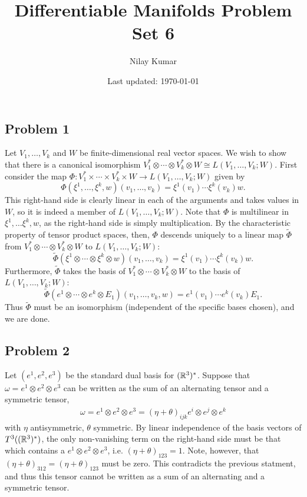 \documentclass{../../mathnotes}
\title{Differentiable Manifolds Problem Set 6}
\author{Nilay Kumar}
\date{Last updated: \today}
\begin{document}
\maketitle

\subsection*{Problem 1}

Let $V_1,\ldots, V_k$ and $W$ be finite-dimensional real vector spaces. We wish to show that there is a canonical isomorphism
$V_1^* \otimes \cdots \otimes V_k^*\otimes W\cong L(V_1,\ldots,V_k;W)$. First consider the map
$\Phi:V_1^*\times \cdots \times V_k^*\times W\to L(V_1,\ldots,V_k;W)$ given by
\[\Phi(\xi^1,\ldots,\xi^k,w)(v_1,\ldots,v_k)=\xi^1(v_1)\cdots\xi^k(v_k)w.\]
This right-hand side is clearly linear in each of the arguments and takes values in $W$, so it is indeed a member of
$L(V_1,\ldots,V_k;W)$. Note that $\Phi$ is multilinear in $\xi^1,\ldots\xi^k,w$, as the right-hand side is simply
multiplication. By the characteristic property of tensor product spaces, then, $\Phi$ descends uniquely to a linear map
$\tilde\Phi$ from $V_1^* \otimes \cdots \otimes V_k^*\otimes W$ to $L(V_1,\ldots,V_k;W)$:
\[\tilde\Phi(\xi^1 \otimes \cdots \otimes \xi^k \otimes w)(v_1,\ldots,v_k)=\xi^1(v_1)\cdots\xi^k(v_k)w.\]
Furthermore, $\tilde\Phi$ takes the basis of $V_1^* \otimes \cdots \otimes V_k^*\otimes W$ to the
basis of $L(V_1,\ldots,V_k;W)$:
\[\tilde\Phi(e^1\otimes\cdots\otimes e^k \otimes E_1)(v_1,\ldots,v_k,w)=e^1(v_1)\cdots e^k(v_k)E_1.\]
Thus $\tilde\Phi$ must be an isomorphism (independent of the specific bases chosen), and we are done.

\subsection*{Problem 2}

Let $(e^1,e^2,e^3)$ be the standard dual basis for $(\mathbb{R}^3)^*$. Suppose that $\omega=e^1\otimes e^2\otimes e^3$ can be written
as the sum of an alternating tensor and a symmetric tensor,
\begin{align*}
    \omega=e^1\otimes e^2\otimes e^3=\left(\eta+\theta\right)_{ijk}e^i\otimes e^j\otimes e^k
\end{align*}
with $\eta$ antisymmetric, $\theta$ symmetric. By linear independence of the basis vectors of $T^3( (\mathbb{R}^3)^*)$,
the only non-vanishing term on the right-hand side must be that which contains a $e^1\otimes e^2\otimes e^3$,
i.e. $(\eta+\theta)_{123}=1$. Note, however, that $(\eta+\theta)_{312}=(\eta+\theta)_{123}$ must be zero. This
contradicts the previous statment, and thus this tensor cannot be written as a sum of an alternating and a symmetric
tensor.
\end{document}
